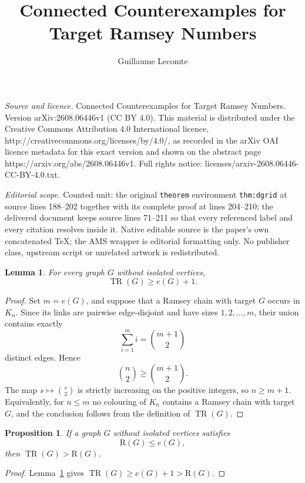 \documentclass[10pt,a4paper]{amsart}
\newtheorem{lemma}[theorem]{Lemma}
\newtheorem{proposition}[theorem]{Proposition}
\DeclareMathOperator{\TR}{TR}
\newcommand{\R}{\mathrm{R}}
\begin{document}
\title[Connected Counterexamples for Target Ramsey Numbers]{Connected Counterexamples for Target Ramsey Numbers}
\author{Guillaume Lecomte}
\date{}
\maketitle
\noindent\emph{Source and licence.} Connected Counterexamples for Target Ramsey Numbers. Version arXiv:2608.06446v1 (CC BY 4.0). This material is distributed under the Creative Commons Attribution 4.0 International licence, http://creativecommons.org/licenses/by/4.0/, as recorded in the arXiv OAI licence metadata for this exact version and shown on the abstract page https://arxiv.org/abs/2608.06446v1. Full rights notice: licenses/arxiv-2608.06446-CC-BY-4.0.txt.\par\smallskip
\noindent\textit{Editorial scope.} Counted unit: the original \texttt{theorem} environment \texttt{thm:dgrid} at source lines 188--202 together with its complete proof at lines 204--210; the delivered document keeps source lines 71--211 so that every referenced label and every citation resolves inside it. Native editable source is the paper's own concatenated TeX; the AMS wrapper is editorial formatting only. No publisher class, upstream script or unrelated artwork is redistributed.
\begin{lemma}\label{lem:count}
For every graph $G$ without isolated vertices,
\[
\TR(G) \geq e(G) + 1.
\]
\end{lemma}

\begin{proof}
Set $m = e(G)$, and suppose that a Ramsey chain with target $G$ occurs in $K_n$. Since its links are pairwise edge-disjoint and have sizes $1, 2, \ldots, m$, their union contains exactly
\[
\sum_{i=1}^{m} i = \binom{m+1}{2}
\]
distinct edges. Hence
\[
\binom{n}{2} \geq \binom{m+1}{2}.
\]
The map $s \mapsto \binom{s}{2}$ is strictly increasing on the positive integers, so $n \geq m+1$. Equivalently, for $n \leq m$ no colouring of $K_n$ contains a Ramsey chain with target $G$, and the conclusion follows from the definition of $\TR(G)$.
\end{proof}

\begin{proposition}\label{prop:criterion}
If a graph $G$ without isolated vertices satisfies
\[
\R(G) \leq e(G),
\]
then $\TR(G) > \R(G)$.
\end{proposition}

\begin{proof}
Lemma~\ref{lem:count} gives $\TR(G) \geq e(G) + 1 > \R(G)$.
\end{proof}
\end{document}
